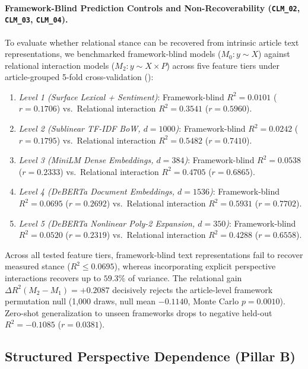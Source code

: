 \paragraph{Framework-Blind Prediction Controls and Non-Recoverability (\texttt{CLM\_02}, \texttt{CLM\_03}, \texttt{CLM\_04}).}
To evaluate whether relational stance can be recovered from intrinsic article text representations, we benchmarked framework-blind models ($M_0: y \sim X$) against relational interaction models ($M_2: y \sim X \times P$) across five feature tiers under article-grouped 5-fold cross-validation ():
\begin{enumerate}
    \item \emph{Level 1 (Surface Lexical + Sentiment)}: Framework-blind $R^2 = 0.0101$ ($r = 0.1706$) vs.\ Relational interaction $R^2 = 0.3541$ ($r = 0.5960$).
    \item \emph{Level 2 (Sublinear TF-IDF BoW, $d=1000$)}: Framework-blind $R^2 = 0.0242$ ($r = 0.1795$) vs.\ Relational interaction $R^2 = 0.5482$ ($r = 0.7410$).
    \item \emph{Level 3 (MiniLM Dense Embeddings, $d=384$)}: Framework-blind $R^2 = 0.0538$ ($r = 0.2333$) vs.\ Relational interaction $R^2 = 0.4705$ ($r = 0.6865$).
    \item \emph{Level 4 (DeBERTa Document Embeddings, $d=1536$)}: Framework-blind $R^2 = 0.0695$ ($r = 0.2692$) vs.\ Relational interaction $R^2 = \mathbf{0.5931}$ ($r = 0.7702$).
    \item \emph{Level 5 (DeBERTa Nonlinear Poly-2 Expansion, $d=350$)}: Framework-blind $R^2 = 0.0520$ ($r = 0.2319$) vs.\ Relational interaction $R^2 = 0.4288$ ($r = 0.6558$).
\end{enumerate}
Across all tested feature tiers, framework-blind text representations fail to recover measured stance ($R^2 \le 0.0695$), whereas incorporating explicit perspective interactions recovers up to $59.3\%$ of variance.
The relational gain $\Delta R^2(M_2 - M_1) = +0.2087$ decisively rejects the article-level framework permutation null (1,000 draws, null mean $-0.1140$, Monte Carlo $p = \mathbf{0.0010}$). Zero-shot generalization to unseen frameworks drops to negative held-out $R^2 = -0.1085$ ($r = 0.0381$).

\subsection{Structured Perspective Dependence (Pillar B)}
\label{sec:structured_perspective_dependence}

